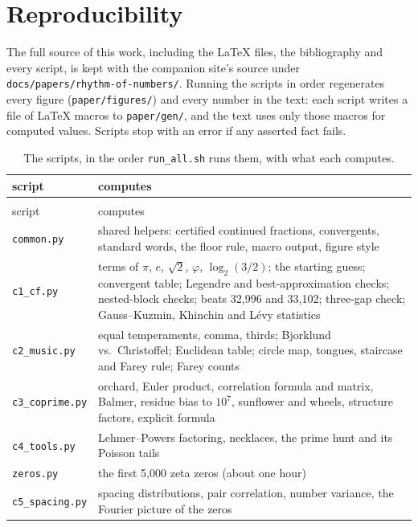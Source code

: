 \chapter{Reproducibility}\label{app:repro}

The full source of this work, including the \LaTeX{} files, the bibliography and every script, is kept with the companion site's source under \texttt{docs/papers/rhythm-of-numbers/}. Running the scripts in order regenerates every figure (\texttt{paper/figures/}) and every number in the text: each script writes a file of \LaTeX{} macros to \texttt{paper/gen/}, and the text uses only those macros for computed values. Scripts stop with an error if any asserted fact fails.

{\small
\begin{longtable}{@{}>{\raggedright\arraybackslash}p{}>{\raggedright\arraybackslash}p{}@{}}
\caption[The scripts]{The scripts, in the order \texttt{run\_all.sh} runs them, with what each computes.}\label{tab:scripts}\\
\toprule
script & computes \\
\midrule
\endfirsthead
\multicolumn{2}{@{}l}{\footnotesize\itshape \Cref{tab:scripts}, continued}\\
\toprule
script & computes \\
\midrule
\endhead
\bottomrule
\endlastfoot
\texttt{common.py} & shared helpers: certified continued fractions, convergents, standard words, the floor rule, macro output, figure style \\
\texttt{c1\_cf.py} & terms of $\pi$, $e$, $\sqrt2$, $\varphi$, $\log_2(3/2)$; the starting guess; convergent table; Legendre and best-approximation checks; nested-block checks; beats 32,996 and 33,102; three-gap check; Gauss--Kuzmin, Khinchin and Lévy statistics \\
\texttt{c2\_music.py} & equal temperaments, comma, thirds; Bjorklund vs.\ Christoffel; Euclidean table; circle map, tongues, staircase and Farey rule; Farey counts \\
\texttt{c3\_coprime.py} & orchard, Euler product, correlation formula and matrix, Balmer, residue bias to $10^7$, sunflower and wheels, structure factors, explicit formula \\
\texttt{c4\_tools.py} & Lehmer--Powers factoring, necklaces, the prime hunt and its Poisson tails \\
\texttt{zeros.py} & the first 5{,}000 zeta zeros (about one hour) \\
\texttt{c5\_spacing.py} & spacing distributions, pair correlation, number variance, the Fourier picture of the zeros \\

\end{longtable}}
